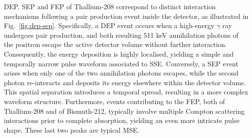 \ac{DEP}, \ac{SEP} and \ac{FEP} of Thallium-208 correspond to distinct interaction mechanisms following a pair production event inside the detector, as illustrated in Fig.~\ref{fig:dep-sep}. Specifically, a \ac{DEP} event occurs when a high-energy $\gamma$ ray undergoes pair production, and both resulting 511 keV annihilation photons of the positron escape the active detector volume without further interaction. Consequently, the energy deposition is highly localised, yielding a simple and temporally narrow pulse waveform associated to \ac{SSE}.
Conversely, a \ac{SEP} event arises when only one of the two annihilation photons escapes, while the second photon re-interacts and deposits its energy elsewhere within the detector volume. This spatial separation introduces a temporal spread, resulting in a more complex waveform structure. Furthermore, events contributing to the \ac{FEP}, both of Thallium-208 and of Bismuth-212, typically involve multiple Compton scattering interactions prior to complete absorption, yielding an even more intricate pulse shape. These last two peaks are typical \ac{MSE}.

